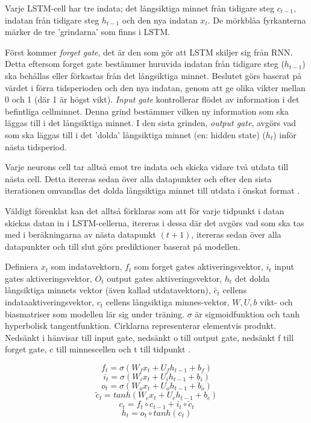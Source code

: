 \documentclass[11pt]{article}
\begin{document}
Varje LSTM-cell har tre indata; det långsiktiga minnet från tidigare steg \(c_{t-1}\), indatan från tidigare steg \(h_{t-1}\) och den nya indatan \(x_{t}\). De mörkblåa fyrkanterna märker de tre 'grindarna' som finns i LSTM. 

Först kommer \textit{forget gate}, det är den som gör att LSTM skiljer sig från RNN. Detta eftersom forget gate bestämmer huruvida indatan från tidigare steg (\(h_{t-1}\)) ska behållas eller förkastas från det långsiktiga minnet. Beslutet görs baserat på värdet i förra tidsperioden och den nya indatan, genom att ge olika vikter mellan 0 och 1 (där 1 är högst vikt). \textit{Input gate} kontrollerar flödet av information i det befintliga cellminnet. Denna grind bestämmer vilken ny information som ska läggas till i det långsiktiga minnet. I den sista grinden, \textit{output gate}, avgörs vad som ska läggas till i det 'dolda' långsiktiga minnet (en: hidden state) (\(h_{t}\)) inför nästa tidsperiod.

Varje neurons cell tar alltså emot tre indata och skicka vidare två utdata till nästa cell. Detta itereras sedan över alla datapunkter och efter den sista iterationen omvandlas det dolda långsiktiga minnet till utdata i önskat format \parencite{purkait2019hands}.

Väldigt förenklat kan det alltså förklaras som  att för varje tidpunkt i datan skickas datan in i LSTM-cellerna, itereras i dessa där det avgörs vad som ska tas med i beräkningarna av nästa datapunkt $(t+1)$, itereras sedan över alla datapunkter och till slut görs prediktioner baserat på modellen. 

Definiera \(x_t\) som indatavektorn, \(f_t\) som forget gates aktiveringsvektor, \(i_t\) input gates aktiveringsvektor, \(O_t\) output gates aktiveringsvektor, \(h_t\) det dolda långsiktiga minnets vektor (även kallad utdatavektorn), \(\tilde{c_t}\) cellens indataaktiveringsvektor, \(c_t\) cellens långsiktiga minnes-vektor, \(W, U, b\) vikt- och biasmatriser som modellen lär sig under träning. \(\sigma\) är sigmoidfunktion och tanh hyperbolisk tangentfunktion. Cirklarna representerar elementvis produkt. Nedsänkt i hänvisar till input gate, nedsänkt o till output gate, nedsänkt f till forget gate, c till minnescellen och t till tidpunkt \parencite{purkait2019hands}. 

\begin{equation}f_t = \sigma(W_f x_t + U_f h_{t-1} + b_f)\end{equation}
\begin{equation}i_t = \sigma(W_i x_t + U_i h_{t-1} + b_i)\end{equation}
\begin{equation}o_t = \sigma(W_o x_t + U_o h_{t-1} + b_o)\end{equation}
\begin{equation}\tilde{c}_t = tanh(W_c x_t + U_c h_{t-1} + b_c)\end{equation}
\begin{equation}c_t= f_t \circ c_{t-1} + i_t \circ \tilde{c}_t\end{equation}
\begin{equation}h_t= o_t \circ tanh(c_t)\end{equation}
\end{document}
